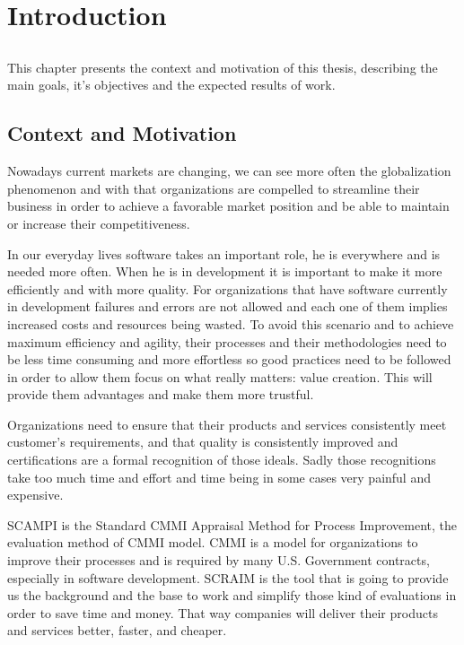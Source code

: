 \chapter{Introduction} \label{chap:intro}

\section*{}

This chapter presents the context and motivation of this thesis, describing the main goals, it’s objectives and the expected results of work.

\section{Context and Motivation} \label{sec:context}

Nowadays current markets are changing, we can see more often the globalization phenomenon and with that organizations are compelled to streamline their business in order to achieve a favorable market position and be able to maintain or increase their competitiveness.

In our everyday lives software takes an important role, he is everywhere and is needed more often. When he is in development it is important to make it more efficiently and with more quality. For organizations that have software currently in development failures and errors are not allowed and each one of them implies increased costs and resources being wasted. To avoid this scenario and to achieve maximum efficiency and agility, their processes and their methodologies need to be less time consuming and more effortless so good practices need to be followed in order to allow them focus on what really matters: value creation. This will provide them advantages and make them more trustful.

Organizations need to ensure that their products and services consistently meet customer’s requirements, and that quality is consistently improved and certifications are a formal recognition of those ideals. Sadly those recognitions take too much time and effort and time being in some cases very painful and expensive.

SCAMPI is the Standard CMMI Appraisal Method for Process Improvement, the evaluation method of CMMI model. CMMI is a model for organizations to improve their processes and is required by many U.S. Government contracts, especially in software development. SCRAIM is the tool that is going to provide us the background and the base to work and simplify those kind of evaluations in order to save time and money. That way companies will deliver their products and services better, faster, and cheaper. 

